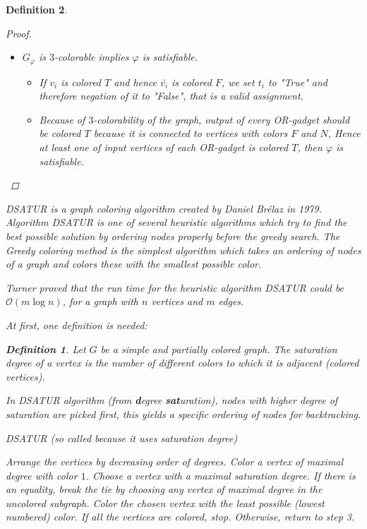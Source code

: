 \documentclass[12pt]{article}
\theoremstyle{slplain}
\newtheorem{defi}{Definition}
\begin{document}
\begin{defi}
\begin{proof}
\begin{itemize}
\begin{itemize}
\end{itemize}
\item $G_\varphi$ is $3$-colorable implies $\varphi$ is satisfiable.
\begin{itemize}
\item If $v_i$ is colored $T$ and hence $\bar{v_i}$ is colored $F$, we set $t_i$ to "True" and therefore negation of it to "False", that is a valid assignment.

\item Because of $3$-colorability of the graph, output of every OR-gadget should be colored $T$ because it is connected to vertices with colors $F$ and $N$, Hence at least one of input vertices of each OR-gadget is colored $T$, then $\varphi$ is satisfiable. 
\end{itemize}
\end{itemize}

\end{proof}


DSATUR is a graph coloring algorithm created by Daniel Br\'elaz \cite{brelaz} in 1979. Algorithm DSATUR is one of several heuristic algorithms which try to find the best possible solution by ordering nodes properly before the greedy search. The Greedy coloring method is the simplest algorithm which takes an ordering of nodes of a graph and colors these with the smallest possible color. 

Turner \cite{turner} proved that the run time for the heuristic algorithm DSATUR could be $\mathcal{O}(m \log n)$, for a graph with $n$ vertices and $m$ edges.

At first, one definition is needed:

\begin{defi}
Let $G$ be a simple and partially colored graph. The saturation degree of a vertex is the number of different colors to which it is adjacent (colored vertices).\cite{brelaz}
\end{defi}

In DSATUR algorithm (from {\bf d}egree {\bf sat}uration), nodes with higher degree of saturation are picked first, this yields a specific ordering of nodes for backtracking.

\vspace{1cm}

\begin{algorithm}[H]
\SetAlgoLined
\DontPrintSemicolon
  \caption{DSATUR (so called because it uses saturation degree)\cite{brelaz}}

  Arrange the vertices by decreasing order of degrees.\;
   Color a vertex of maximal degree with color $1$.\;
  Choose a vertex with a maximal saturation degree. If there is an
equality, break the tie by choosing any vertex of maximal degree in the uncolored
subgraph.\;
    Color the chosen vertex with the least possible (lowest numbered)
color.\;
  If all the vertices are colored, stop. Otherwise, return to step 3.\;
 

\end{algorithm}
\end{defi}
\end{document}
